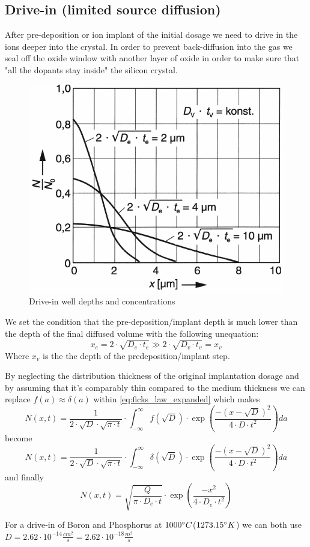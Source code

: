 \subsection{Drive-in (limited source diffusion)}
After pre-deposition or ion implant of the initial dosage we need to drive in the ions deeper into the crystal.
In order to prevent back-diffusion into the gas we seal off the oxide window with another layer of oxide in order to make sure that "all the dopants stay inside" the silicon crystal.

\begin{figure}[H]
	\centering
	\includegraphics[scale=0.5]{dopants_drive_in_depth.png}
	\caption{Drive-in well depths and concentrations}
\end{figure}

We set the condition that the pre-deposition/implant depth is much lower than the depth of the final diffused volume with the following unequation:
\begin{equation}
x_e = 2 \cdot \sqrt{D_e \cdot t_e} \gg 2 \cdot \sqrt{D_v \cdot t_v} = x_v
\end{equation}
Where $x_v$ is the the depth of the predeposition/implant step.

By neglecting the distribution thickness of the original implantation dosage and by assuming that it's comparably thin compared to the medium thickness we can replace  $f(a) \approx \delta(a)$ within \autoref{eq:ficks_law_expanded} which makes
\begin{equation}
N(x,t) = \frac{1}{2 \cdot \sqrt{D} \cdot \sqrt{\pi \cdot t}} \cdot \int_{-\infty}^{\infty}{f(\sqrt{D})\cdot\exp\left(\frac{-(x-\sqrt{D})^2}{4 \cdot D \cdot t^2}\right)}da
\end{equation}
become
\begin{equation}
N(x,t)
=
\frac{1}{2 \cdot \sqrt{D} \cdot \sqrt{\pi \cdot t}} \cdot \int_{-\infty}^{\infty}{\delta(\sqrt{D})\cdot\exp\left(\frac{-(x-\sqrt{D})^2}{4 \cdot D \cdot t^2}\right)}da
\end{equation}
and finally
\begin{equation}
N(x,t)
=
\sqrt{\frac{Q}{\pi \cdot D_e \cdot t}} \cdot \exp\left(\frac{-x^2}{4 \cdot D_e \cdot t^2}\right)
\end{equation}

For a drive-in of Boron and Phosphorus at $1000\degree C$($1273.15\degree K$) we can both use $D=2.62 \cdot 10^{-14} \frac{cm^2 }{s}=2.62 \cdot 10^{-18} \frac{m^2 }{s}$